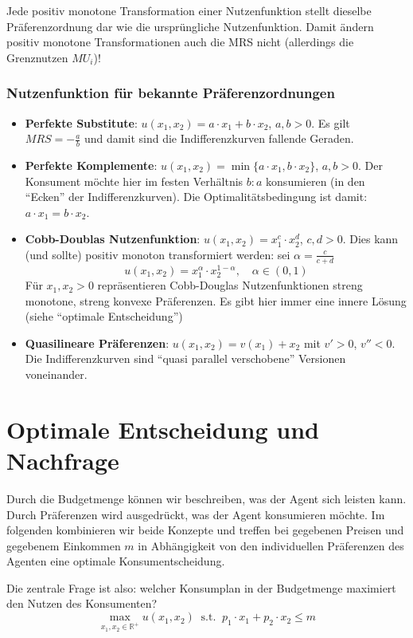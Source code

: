 Jede positiv monotone Transformation einer Nutzenfunktion stellt dieselbe Präferenzordnung dar wie die ursprüngliche Nutzenfunktion. Damit ändern positiv monotone Transformationen auch die MRS nicht (allerdings die Grenznutzen $MU_i$)!

\subsubsection*{Nutzenfunktion für bekannte Präferenzordnungen}
\begin{itemize}
	\item \textbf{Perfekte Substitute}: $u(x_1, x_2) = a \cdot x_1 + b \cdot x_2$, $a, b > 0$. Es gilt $MRS = - \frac{a}{b}$ und damit sind die Indifferenzkurven fallende Geraden.
	\item \textbf{Perfekte Komplemente}: $u(x_1, x_2) = \min \{ a \cdot x_1, b \cdot x_2 \}$, $a, b > 0$. Der Konsument möchte hier im festen Verhältnis $b : a$ konsumieren (in den \enquote{Ecken} der Indifferenzkurven). Die Optimalitätsbedingung ist damit: $a \cdot x_1 = b \cdot x_2$.
	\item \textbf{Cobb-Doublas Nutzenfunktion}: $u(x_1, x_2) = x_1^c \cdot x_2^d$, $c, d > 0$. Dies kann (und sollte) positiv monoton transformiert werden: sei $\alpha = \frac{c}{c + d}$
		$$ u(x_1, x_2) = x_1^{\alpha} \cdot x_2^{1 - \alpha}, \quad \alpha \in (0, 1) $$
		Für $x_1, x_2 > 0$ repräsentieren Cobb-Douglas Nutzenfunktionen streng monotone, streng konvexe Präferenzen. Es gibt hier immer eine innere Lösung (siehe \enquote{optimale Entscheidung})
	\item \textbf{Quasilineare Präferenzen}: $u(x_1, x_2) = v(x_1) + x_2$ mit $v' > 0$, $v'' < 0$. Die Indifferenzkurven sind \enquote{quasi parallel verschobene} Versionen voneinander.
\end{itemize}

\section{Optimale Entscheidung und Nachfrage}

Durch die Budgetmenge können wir beschreiben, was der Agent sich leisten kann. Durch Präferenzen wird ausgedrückt, was der Agent konsumieren möchte. Im folgenden kombinieren wir beide Konzepte und treffen bei gegebenen Preisen und gegebenem Einkommen $m$ in Abhängigkeit von den individuellen Präferenzen des Agenten eine optimale Konsumentscheidung. ~\bigskip

Die zentrale Frage ist also: welcher Konsumplan in der Budgetmenge maximiert den Nutzen des Konsumenten?
	$$ \max_{x_1, x_2 \in \mathbb{R}^+} u(x_1, x_2) ~\text{ s.t. }~ p_1 \cdot x_1 + p_2 \cdot x_2 \leq m $$ 
	
